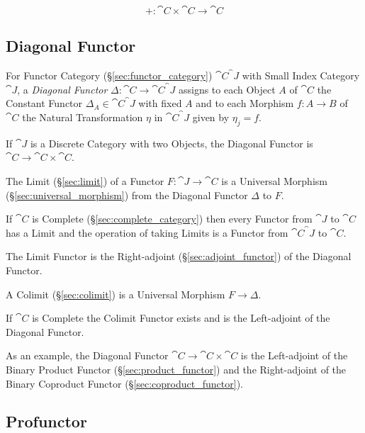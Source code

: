 \[
  + : \cat{C} \times \cat{C} \rightarrow \cat{C}
\]



\subsection{Diagonal Functor}\label{sec:diagonal_functor}

For Functor Category (\S\ref{sec:functor_category})
$\cat{C}^\cat{J}$ with Small Index Category $\cat{J}$, a
\emph{Diagonal Functor} $\Delta : \cat{C} \rightarrow
\cat{C}^\cat{J}$ assigns to each Object $A$ of $\cat{C}$ the
Constant Functor $\Delta_A \in \cat{C}^\cat{J}$ with fixed $A$
and to each Morphism $f : A \rightarrow B$ of $\cat{C}$ the Natural
Transformation $\eta$ in $\cat{C}^\cat{J}$ given by $\eta_j =
f$.

If $\cat{J}$ is a Discrete Category with two Objects, the Diagonal
Functor is $\cat{C} \rightarrow \cat{C} \times \cat{C}$.

The Limit (\S\ref{sec:limit}) of a Functor $F : \cat{J} \rightarrow
\cat{C}$ is a Universal Morphism (\S\ref{sec:universal_morphism})
from the Diagonal Functor $\Delta$ to $F$.

If $\cat{C}$ is Complete (\S\ref{sec:complete_category}) then every
Functor from $\cat{J}$ to $\cat{C}$ has a Limit and the
operation of taking Limits is a Functor from $\cat{C}^\cat{J}$
to $\cat{C}$.

The Limit Functor is the Right-adjoint (\S\ref{sec:adjoint_functor})
of the Diagonal Functor.

A Colimit (\S\ref{sec:colimit}) is a Universal Morphism $F \rightarrow
\Delta$.

If $\cat{C}$ is Complete the Colimit Functor exists and is the
Left-adjoint of the Diagonal Functor.

As an example, the Diagonal Functor $\cat{C} \rightarrow \cat{C}
\times \cat{C}$ is the Left-adjoint of the Binary Product Functor
(\S\ref{sec:product_functor}) and the Right-adjoint of the Binary
Coproduct Functor (\S\ref{sec:coproduct_functor}).



\subsection{Profunctor}\label{sec:profunctor}

